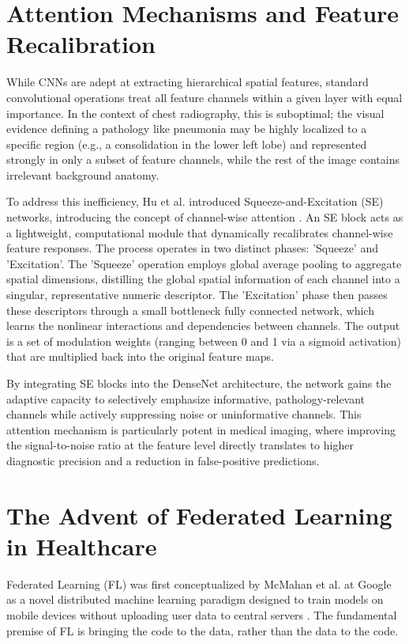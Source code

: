 \documentclass[12pt,a4paper]{report}
\begin{document}
\section{Attention Mechanisms and Feature Recalibration}

While CNNs are adept at extracting hierarchical spatial features, standard convolutional operations treat all feature channels within a given layer with equal importance. In the context of chest radiography, this is suboptimal; the visual evidence defining a pathology like pneumonia may be highly localized to a specific region (e.g., a consolidation in the lower left lobe) and represented strongly in only a subset of feature channels, while the rest of the image contains irrelevant background anatomy.

To address this inefficiency, Hu et al. introduced Squeeze-and-Excitation (SE) networks, introducing the concept of channel-wise attention \cite{hu2018squeeze}. An SE block acts as a lightweight, computational module that dynamically recalibrates channel-wise feature responses. The process operates in two distinct phases: 'Squeeze' and 'Excitation'. The 'Squeeze' operation employs global average pooling to aggregate spatial dimensions, distilling the global spatial information of each channel into a singular, representative numeric descriptor. The 'Excitation' phase then passes these descriptors through a small bottleneck fully connected network, which learns the nonlinear interactions and dependencies between channels. The output is a set of modulation weights (ranging between 0 and 1 via a sigmoid activation) that are multiplied back into the original feature maps.

By integrating SE blocks into the DenseNet architecture, the network gains the adaptive capacity to selectively emphasize informative, pathology-relevant channels while actively suppressing noise or uninformative channels. This attention mechanism is particularly potent in medical imaging, where improving the signal-to-noise ratio at the feature level directly translates to higher diagnostic precision and a reduction in false-positive predictions.

\section{The Advent of Federated Learning in Healthcare}

Federated Learning (FL) was first conceptualized by McMahan et al. at Google as a novel distributed machine learning paradigm designed to train models on mobile devices without uploading user data to central servers \cite{mcmahan2017communication}. The fundamental premise of FL is bringing the code to the data, rather than the data to the code.
\end{document}
